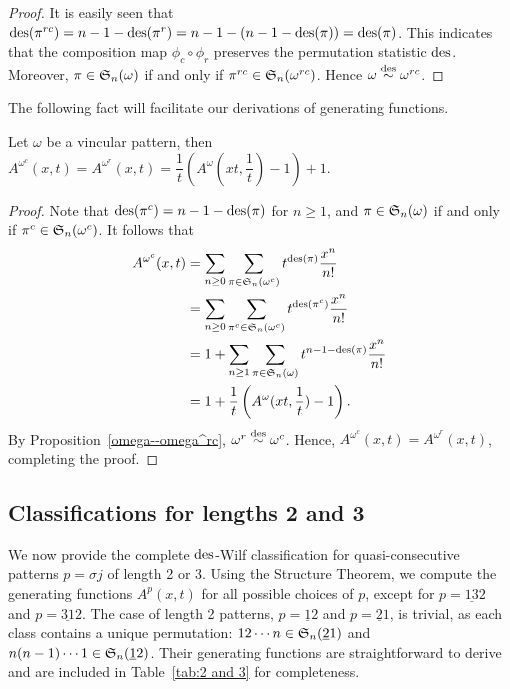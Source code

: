 \begin{proof}
    It is easily seen that $\des(\pi^{rc})=n-1-\des(\pi^r)=n-1-(n-1-\des(\pi))=\des(\pi)$.
    This indicates that the composition map $\phi_c\circ\phi_r$ preserves the permutation statistic $\des$. Moreover, $\pi \in \S_n(\omega )$ if and only if $\pi^{rc} \in \S_n(\omega^{rc} )$.
    Hence $\omega \overset{\des}{\sim} \omega^{rc}$.
\end{proof}

The following fact will facilitate our derivations of generating functions.

\begin{proposition} \label{omega--omega^c}
    Let $\omega$ be a vincular pattern, then $A^{\omega^c}(x,t)=A^{\omega^r}(x,t)=\dfrac{1}{t} (A^{\omega}(xt,\dfrac{1}{t})-1)+1$.
\end{proposition}

\begin{proof}
    Note that $\des(\pi ^c)=n-1-\des(\pi)$ for $n\ge 1$, and $\pi \in \S_n(\omega) $ if and only if $\pi ^c \in \S_n(\omega^c)$.
    It follows that
    \begin{align*}
        A^{\omega^c}(x,t)&=\sum_{n\ge 0} \sum_{\pi\in \S_n(\omega ^c)} t ^{\des (\pi)}\dfrac{x^n}{n!} \\
        &= \sum_{n\ge 0} \sum_{\pi^c \in \S_n(\omega ^c)} t ^{\des (\pi^c)}\dfrac{x^n}{n!}\\
        &=1+ \sum_{n\ge 1} \sum_{\pi \in \S_n(\omega )} t ^{n-1-\des (\pi)}\dfrac{x^n}{n!}  \\
        &=1+\dfrac{1}{t} \left(A^{\omega}(xt,\dfrac{1}{t})-1\right).
    \end{align*}
   By Proposition~\ref{omega--omega^rc}, $\omega^r \overset{\des}{\sim} \omega^{c}$. Hence, $A^{\omega^c}(x,t) = A^{\omega^r}(x,t)$, completing the proof.
\end{proof}



\subsection{Classifications for lengths 2 and 3}

We now provide the complete $\des$-Wilf classification for quasi-consecutive patterns $p = \sigma j$ of length 2 or 3. Using the Structure Theorem, we compute the generating functions $A^p(x, t)$ for all possible choices of $p$, except for $p = \underline{13}2$ and $p = \underline{31}2$. The case of length 2 patterns, $p = \underline{1}2$ and $p = \underline{2}1$, is trivial, as each class contains a unique permutation: $12\cdots n \in \S_n(\underline{2}1)$ and $n(n-1)\cdots 1 \in \S_n(\underline{1}2)$. Their generating functions are straightforward to derive and are included in Table~\ref{tab:2 and 3} for completeness.

